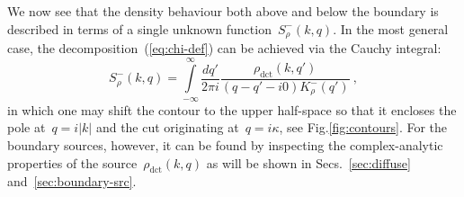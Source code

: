 \documentclass[preprint,aps,eqsecnum, prb]{revtex4-1}
\newcommand{\fminus}[1]{{#1}^{-}}
\newcommand{\dct}[1]{{#1}_\mathrm{dct}}
\begin{document}
We now see that the density behaviour both above and below the
boundary is described in terms of a single unknown
function~$\fminus{S}_\rho(k, q)$. In the most  general case,
the decomposition~(\ref{eq:chi-def})  can be achieved via the Cauchy integral:
\begin{equation}
  \label{eq:solution-chi}
  \fminus{S}_\rho(k, q) = \int\limits_{-\infty}^{\infty} \frac{dq'}{2\pi i}
  \frac{\dct{\rho}(k, q')}{(q - q' - i0) \fminus{K}_\rho(q')}
  \ ,
\end{equation}
in which one may shift the contour to the upper half-space so that
it encloses the pole at~$q = i |k|$ and the cut originating
at~$q = i \kappa$, see Fig.\ref{fig:contours}.
For the boundary sources, however, it can be found by inspecting the
complex-analytic properties of
the source~$\dct{\rho}(k, q)$ as will be
shown in Secs.~\ref{sec:diffuse} and~\ref{sec:boundary-src}.
\end{document}
